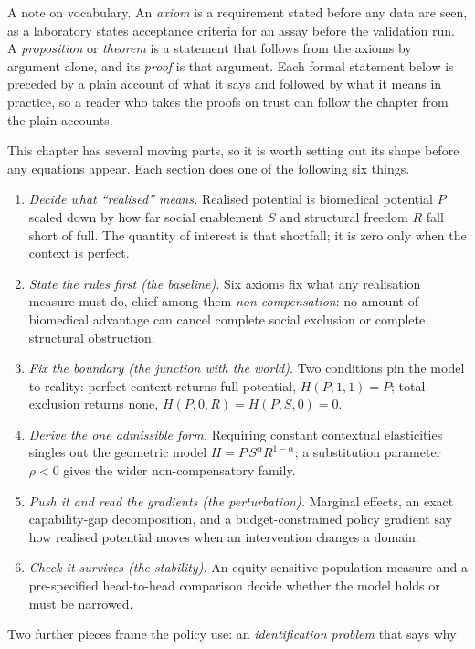 A note on vocabulary. An \emph{axiom} is a requirement stated before any data
are seen, as a laboratory states acceptance criteria for an assay before the
validation run. A \emph{proposition} or \emph{theorem} is a statement that
follows from the axioms by argument alone, and its \emph{proof} is that
argument. Each formal statement below is preceded by a plain account of what it
says and followed by what it means in practice, so a reader who takes the
proofs on trust can follow the chapter from the plain accounts.

\begin{ataglance}
This chapter has several moving parts, so it is worth setting out its shape before
any equations appear. Each section does one of the following six things.
\begin{enumerate}\setlength{\itemsep}{2pt}
\item \emph{Decide what ``realised'' means.} Realised potential is biomedical
potential $P$ scaled down by how far social enablement $S$ and structural freedom
$R$ fall short of full. The quantity of interest is that shortfall; it is zero only
when the context is perfect.
\item \emph{State the rules first (the baseline).} Six axioms fix what any
realisation measure must do, chief among them \emph{non-compensation}: no amount of
biomedical advantage can cancel complete social exclusion or complete structural
obstruction.
\item \emph{Fix the boundary (the junction with the world).} Two conditions pin the
model to reality: perfect context returns full potential, $H(P,1,1)=P$; total
exclusion returns none, $H(P,0,R)=H(P,S,0)=0$.
\item \emph{Derive the one admissible form.} Requiring constant contextual
elasticities singles out the geometric model $H=P\,S^{\alpha}R^{1-\alpha}$; a
substitution parameter $\rho<0$ gives the wider non-compensatory family.
\item \emph{Push it and read the gradients (the perturbation).} Marginal effects,
an exact capability-gap decomposition, and a budget-constrained policy gradient say
how realised potential moves when an intervention changes a domain.
\item \emph{Check it survives (the stability).} An equity-sensitive population
measure and a pre-specified head-to-head comparison decide whether the model holds
or must be narrowed.
\end{enumerate}
Two further pieces frame the policy use: an \emph{identification problem} that says why

\end{ataglance}
